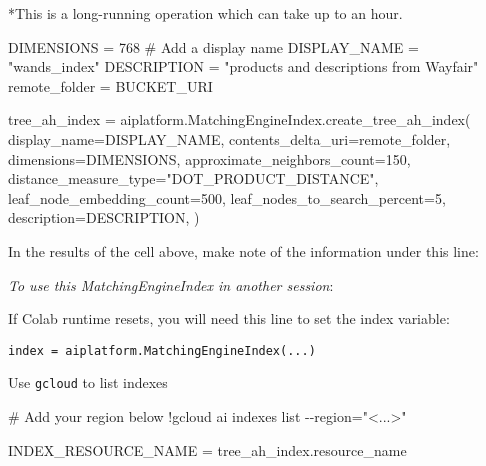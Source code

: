 \documentclass[
  letterpaper,
  DIV=11,
  numbers=noendperiod]{scrreprt}
\newenvironment{Shaded}{\begin{snugshade}}{\end{snugshade}}
\newcommand{\BuiltInTok}[1]{\textcolor[rgb]{0.00,0.23,0.31}{#1}}
\newcommand{\CommentTok}[1]{\textcolor[rgb]{0.37,0.37,0.37}{#1}}
\newcommand{\DecValTok}[1]{\textcolor[rgb]{0.68,0.00,0.00}{#1}}
\newcommand{\NormalTok}[1]{\textcolor[rgb]{0.00,0.23,0.31}{#1}}
\newcommand{\OperatorTok}[1]{\textcolor[rgb]{0.37,0.37,0.37}{#1}}
\newcommand{\StringTok}[1]{\textcolor[rgb]{0.13,0.47,0.30}{#1}}
\begin{document}
*This is a long-running operation which can take up to an hour.

\begin{Shaded}
\begin{Highlighting}[]
\NormalTok{DIMENSIONS }\OperatorTok{=} \DecValTok{768}
\CommentTok{\# Add a display name}
\NormalTok{DISPLAY\_NAME }\OperatorTok{=} \StringTok{"wands\_index"}
\NormalTok{DESCRIPTION }\OperatorTok{=} \StringTok{"products and descriptions from Wayfair"}
\NormalTok{remote\_folder }\OperatorTok{=}\NormalTok{ BUCKET\_URI}

\NormalTok{tree\_ah\_index }\OperatorTok{=}\NormalTok{ aiplatform.MatchingEngineIndex.create\_tree\_ah\_index(}
\NormalTok{    display\_name}\OperatorTok{=}\NormalTok{DISPLAY\_NAME,}
\NormalTok{    contents\_delta\_uri}\OperatorTok{=}\NormalTok{remote\_folder,}
\NormalTok{    dimensions}\OperatorTok{=}\NormalTok{DIMENSIONS,}
\NormalTok{    approximate\_neighbors\_count}\OperatorTok{=}\DecValTok{150}\NormalTok{,}
\NormalTok{    distance\_measure\_type}\OperatorTok{=}\StringTok{"DOT\_PRODUCT\_DISTANCE"}\NormalTok{,}
\NormalTok{    leaf\_node\_embedding\_count}\OperatorTok{=}\DecValTok{500}\NormalTok{,}
\NormalTok{    leaf\_nodes\_to\_search\_percent}\OperatorTok{=}\DecValTok{5}\NormalTok{,}
\NormalTok{    description}\OperatorTok{=}\NormalTok{DESCRIPTION,}
\NormalTok{)}
\end{Highlighting}
\end{Shaded}

In the results of the cell above, make note of the information under
this line:

\emph{To use this MatchingEngineIndex in another session}:

If Colab runtime resets, you will need this line to set the index
variable:

\texttt{index\ =\ aiplatform.MatchingEngineIndex(...)}

Use \texttt{gcloud} to list indexes

\begin{Shaded}
\begin{Highlighting}[]
\CommentTok{\# Add your region below}
\OperatorTok{!}\NormalTok{gcloud ai indexes }\BuiltInTok{list} \OperatorTok{{-}{-}}\NormalTok{region}\OperatorTok{=}\StringTok{"\textless{}...\textgreater{}"}
\end{Highlighting}
\end{Shaded}

\begin{Shaded}
\begin{Highlighting}[]
\NormalTok{INDEX\_RESOURCE\_NAME }\OperatorTok{=}\NormalTok{ tree\_ah\_index.resource\_name}
\end{Highlighting}
\end{Shaded}
\end{document}
